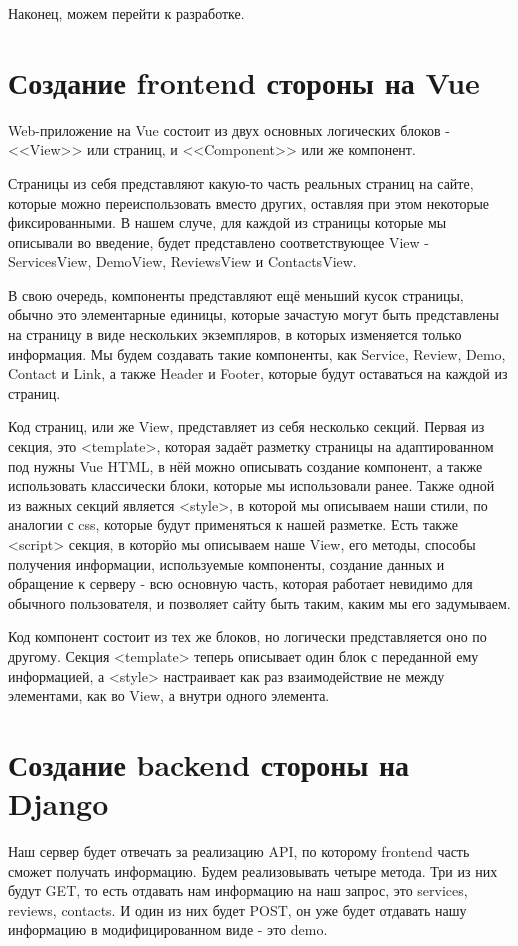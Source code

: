 \documentclass{article}
\begin{document}
Наконец, можем перейти к разработке.


\section{Создание frontend стороны на Vue}

 Web-приложение на Vue состоит из двух основных логических блоков - <<View>> или страниц, и <<Component>> или же компонент. 
 
 Страницы из себя представляют какую-то часть реальных страниц на сайте, которые можно переиспользовать вместо других, оставляя при этом некоторые фиксированными. В нашем случе, для каждой из страницы которые мы описывали во введение, будет представлено соответствующее View - ServicesView, DemoView, ReviewsView и ContactsView.
 
 В свою очередь, компоненты представляют ещё меньший кусок страницы, обычно это элементарные единицы, которые зачастую могут быть представлены на страницу в виде нескольких экземпляров, в которых изменяется только информация. Мы будем создавать такие компоненты, как Service, Review, Demo, Contact и  Link, а также Header и Footer, которые будут оставаться на каждой из страниц.
 
 Код страниц, или же View, представляет из себя несколько секций. Первая из секция, это <template>, которая задаёт разметку страницы на адаптированном под нужны Vue HTML, в нёй можно описывать создание компонент, а также использовать классически блоки, которые мы использовали ранее. Также одной из важных секций является <style>, в которой мы описываем наши стили, по аналогии с css, которые будут применяться к нашей разметке. Есть также <script> секция, в которйо мы описываем наше View, его методы, способы получения информации, используемые компоненты, создание данных и обращение к серверу - всю основную часть, которая работает невидимо для обычного пользователя, и позволяет сайту быть таким, каким мы его задумываем.
 
 Код компонент состоит из тех же блоков, но логически представляется оно по другому. Секция <template> теперь описывает один блок с переданной ему информацией, а <style> настраивает как раз взаимодействие не между элементами, как во View, а внутри одного элемента.


\section{Создание backend стороны на Django}
Наш сервер будет отвечать за реализацию API, по которому frontend часть сможет получать информацию. Будем реализовывать четыре метода. Три из них будут GET, то есть отдавать нам информацию на наш запрос, это services, reviews, contacts. И один из них будет POST, он уже будет отдавать нашу информацию в модифицированном виде - это demo. 
\end{document}
